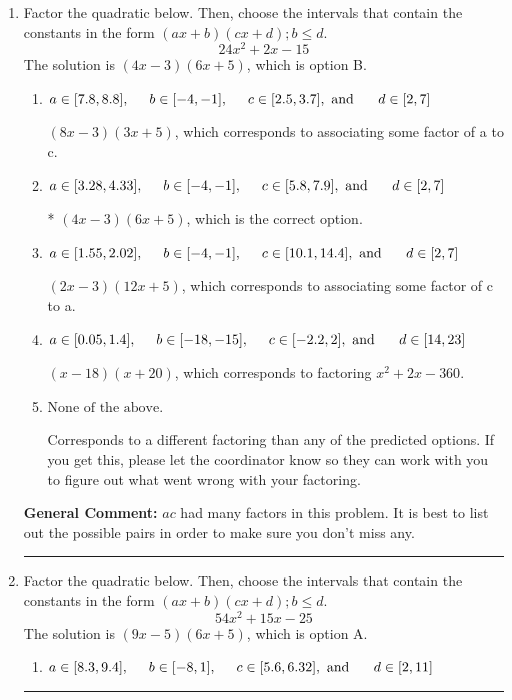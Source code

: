 \documentclass{extbook}[14pt]
\newcommand{\litem}[1]{\item #1

\rule{\textwidth}{0.4pt}}
\begin{document}
\begin{enumerate}\litem{
Factor the quadratic below. Then, choose the intervals that contain the constants in the form $(ax+b)(cx+d); b \leq d.$
\[ 24x^{2} +2 x -15 \]The solution is \( (4x -3)(6x + 5) \), which is option B.\begin{enumerate}[label=\Alph*.]
\item \( a \in [7.8, 8.8], \hspace*{5mm} b \in [-4, -1], \hspace*{5mm} c \in [2.5, 3.7], \text{ and } \hspace*{5mm} d \in [2, 7] \)

 $(8x -3)(3x + 5)$, which corresponds to associating some factor of a to c.
\item \( a \in [3.28, 4.33], \hspace*{5mm} b \in [-4, -1], \hspace*{5mm} c \in [5.8, 7.9], \text{ and } \hspace*{5mm} d \in [2, 7] \)

* $(4x -3)(6x + 5)$, which is the correct option.
\item \( a \in [1.55, 2.02], \hspace*{5mm} b \in [-4, -1], \hspace*{5mm} c \in [10.1, 14.4], \text{ and } \hspace*{5mm} d \in [2, 7] \)

 $(2x -3)(12x + 5)$, which corresponds to associating some factor of c to a.
\item \( a \in [0.05, 1.4], \hspace*{5mm} b \in [-18, -15], \hspace*{5mm} c \in [-2.2, 2], \text{ and } \hspace*{5mm} d \in [14, 23] \)

 $(x -18)(x + 20)$, which corresponds to factoring $x^{2} +2 x -360$.
\item \( \text{None of the above.} \)

 Corresponds to a different factoring than any of the predicted options. If you get this, please let the coordinator know so they can work with you to figure out what went wrong with your factoring.
\end{enumerate}

\textbf{General Comment:} $ac$ had many factors in this problem. It is best to list out the possible pairs in order to make sure you don't miss any.
}
\litem{
Factor the quadratic below. Then, choose the intervals that contain the constants in the form $(ax+b)(cx+d); b \leq d.$
\[ 54x^{2} +15 x -25 \]The solution is \( (9x -5)(6x + 5) \), which is option A.\begin{enumerate}[label=\Alph*.]
\item \( a \in [8.3, 9.4], \hspace*{5mm} b \in [-8, 1], \hspace*{5mm} c \in [5.6, 6.32], \text{ and } \hspace*{5mm} d \in [2, 11] \)


\end{enumerate}}
\end{enumerate}
\end{document}
